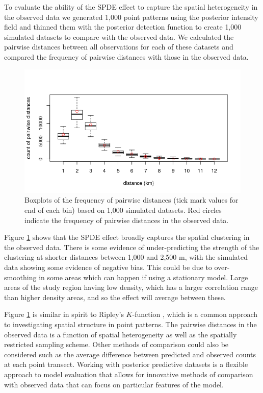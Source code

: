\documentclass{stylefile16/statsoc}
\begin{document}
To evaluate the ability of the SPDE effect to capture the spatial heterogeneity in the observed data we generated 1,000 point patterns using the posterior intensity field and thinned them with the posterior detection function to create 1,000 simulated datasets to compare with the observed data.  We calculated the pairwise distances between all observations for each of these datasets and compared the frequency of pairwise distances with those in the observed data.
\begin{figure}[!htb]
	\begin{center}
		\includegraphics[scale=0.6]{figures/post_pp_distances.png}
		\caption{Boxplots of the frequency of pairwise distances (tick mark values for end of each bin) based on 1,000 simulated datasets.  Red circles indicate the frequency of pairwise distances in the observed data.}
		\label{fig:post-pp-distances}
	\end{center}
\end{figure}
Figure \ref{fig:post-pp-distances} shows that the SPDE effect broadly captures the spatial clustering in the observed data.  There is some evidence of under-predicting the strength of the clustering at shorter distances between 1,000 and 2,500 m, with the simulated data showing some evidence of negative bias.  This could be due to over-smoothing in some areas which can happen if using a stationary model.  Large areas of the study region having low density, which has a larger correlation range than higher density areas, and so the effect will average between these. 

Figure \ref{fig:post-pp-distances} is similar in spirit to Ripley's $K$-function \citep{ripley_SecondorderAnalysisStationary_1976}, which is a common approach to investigating spatial structure in point patterns.  The pairwise distances in the observed data is a function of spatial heterogeneity as well as the spatially restricted sampling scheme.  Other methods of comparison could also be considered such as the average difference between predicted and observed counts at each point transect.  Working with posterior predictive datasets is a flexible approach to model evaluation that allows for innovative methods of comparison with observed data that can focus on particular features of the model.
\end{document}
